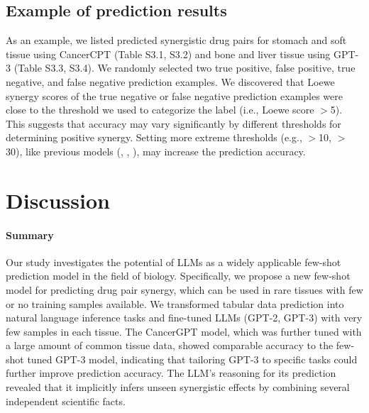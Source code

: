 {\subsection{Example of prediction results}
As an example, we listed predicted synergistic drug pairs for stomach and soft tissue using CancerCPT (Table S3.1, S3.2) and bone and liver tissue using GPT-3 (Table S3.3, S3.4). We randomly selected two true positive, false positive, true negative, and false negative prediction examples.
We discovered that Loewe synergy scores of the true negative or false negative prediction examples were close to the threshold we used to categorize the label (i.e., Loewe score $>$5). This suggests that accuracy may vary significantly by different thresholds for determining positive synergy. Setting more extreme thresholds (e.g., $>$10, $>$30), like previous models (\cite{kim_anticancer_2021}, \cite{kuru_matchmaker_2022}, \cite{hosseini_ccsynergy_2023}), may increase the prediction accuracy. 




\section{Discussion} 

\paragraph{Summary}
Our study investigates the potential of LLMs as a widely applicable few-shot prediction model in the field of biology. Specifically, we propose a new few-shot model for predicting drug pair synergy, which can be used in rare tissues with few or no training samples available. We transformed tabular data prediction into natural language inference tasks and fine-tuned LLMs (GPT-2, GPT-3) with very few samples in each tissue. The CancerGPT model, which was further tuned with a large amount of common tissue data, showed comparable accuracy to the few-shot tuned GPT-3 model, indicating that tailoring GPT-3 to specific tasks could further improve prediction accuracy. The LLM's reasoning for its prediction revealed that it implicitly infers unseen synergistic effects by combining several independent scientific facts. 

}
